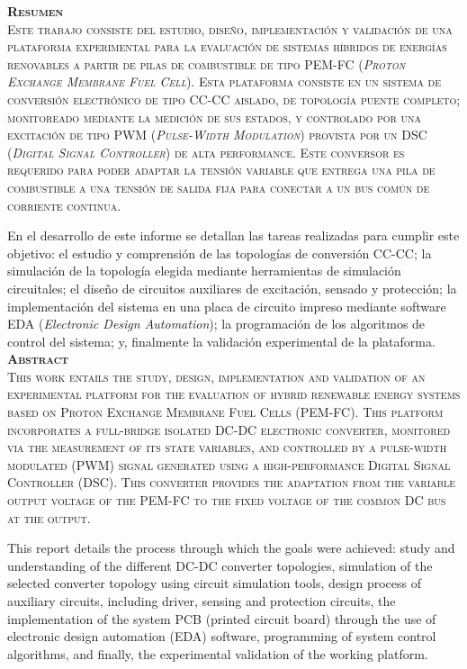 \Huge
\scshape
\textbf{Resumen}\\

\normalfont\normalsize
Este trabajo consiste del estudio, diseño, implementación y validación de una plataforma experimental para la evaluación de sistemas híbridos de energías renovables a partir de pilas de combustible de tipo PEM-FC (\textit{Proton Exchange Membrane Fuel Cell}). Esta plataforma consiste en un sistema de conversión electrónico de tipo CC-CC aislado, de topología puente completo; monitoreado mediante la medición de sus estados, y controlado por una excitación de tipo PWM (\textit{Pulse-Width Modulation}) provista por un DSC (\textit{Digital Signal Controller}) de alta performance. Este conversor es requerido para poder adaptar la tensión variable que entrega una pila de combustible a una tensión de salida fija para conectar a un bus común de corriente continua. 

En el desarrollo de este informe se detallan las tareas realizadas para cumplir este objetivo: el estudio y comprensión de las topologías de conversión CC-CC; la simulación de la topología elegida mediante herramientas de simulación circuitales; el diseño de circuitos auxiliares de excitación, sensado y protección; la implementación del sistema en una placa de circuito impreso mediante software EDA (\textit{Electronic Design Automation}); la programación de los algoritmos de control del sistema; y, finalmente la validación experimental de la plataforma.\\

\vspace{1cm}
\Huge
\scshape
\textbf{Abstract}\\

\normalsize\normalfont
This work entails the study, design, implementation and validation of an experimental platform for the evaluation of hybrid renewable energy systems based on Proton Exchange Membrane Fuel Cells (PEM-FC). This platform incorporates a full-bridge isolated DC-DC electronic converter, monitored via the measurement of its state variables, and controlled by a pulse-width modulated (PWM) signal generated using a high-performance Digital Signal Controller (DSC). This converter provides the adaptation from the variable output voltage of the PEM-FC to the fixed voltage of the common DC bus at the output.

This report details the process through which the goals were achieved: study and understanding of the different DC-DC converter topologies, simulation of the selected converter topology using circuit simulation tools, design process of auxiliary circuits, including driver, sensing and protection circuits, the implementation of the system PCB (printed circuit board) through the use of electronic design automation (EDA) software, programming of system control algorithms, and finally, the experimental validation of the working platform.\\ 